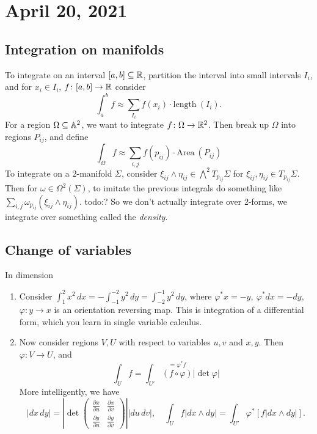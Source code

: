\section{April 20, 2021} 
\subsection{Integration on manifolds}
To integrate on an interval $[a,b]\subseteq \mathbb{R}$, partition the interval into small intervals $I_i $, and for $x_i \in I_i $, $f \colon [a,b] \to \mathbb{R}$ consider\[
    \int_{a}^{b} f\approx \sum_{I_i } f(x_i )\cdot \text{length} \ (I_i ).
\] For a region $\Omega \subseteq \mathbb{A}^2$, we want to integrate $f \colon \Omega \to \mathbb{R}^2$. Then break up $\Omega$ into regions $P_{ij}$, and define \[
\int _{\Omega}f\approx \sum _{i,j}f(p_{ij})\cdot \text{Area} \ (P_{ij}) \] To integrate on a $2$-manifold $\Sigma$, consider $\xi_{ij}\wedge \eta _{ij}\in \bigwedge ^2T_{p_{ij}}\Sigma$ for $\xi_{ij},\eta _{ij}\in T_{p_{ij}}\Sigma$. Then for $\omega \in \Omega^2(\Sigma)$, to imitate the previous integrals do something like $\sum _{i,j}\omega _{p_{ij}}(\xi_{ij}\wedge \eta_{ij})$. {\color{red}todo:?} So we don't actually integrate over 2-forms, we integrate over something called the \emph{density}.

\subsection{Change of variables}
In dimension
\begin{enumerate}[label=\arabic*:]
    \item Consider $\int_{1}^{2} x^2 \, dx=- \int_{-1}^{-2} y^2 \, dy=\int_{-2}^{-1} y^2 \, dy$, where $\varphi ^*x=-y,\ \varphi ^*dx=-dy$, $\varphi  \colon y \to x$ is an orientation reversing map. This is integration of a differential form, which you learn in single variable calculus.
    \item Now consider regions $V,U$ with respect to variables $u,v$ and $x,y$. Then $\varphi  \colon V \to U$, and \[
            \int _{U}f=\int _{U'}\overset{=\varphi ^*f}{(f \circ \varphi )} |\det \varphi | 
    \] More intelligently, we have \[
    |dx\,dy|= \left| \det 
    \begin{pmatrix}
        \frac{\partial x}{\partial u}& \frac{\partial x}{\partial v}\\ \frac{\partial y}{\partial u}& \frac{\partial y}{\partial v}
    \end{pmatrix}\right|  |du\,dv|,\quad \int _U f|dx\wedge dy|= \int _{U'}\varphi ^*[f|dx\wedge dy|] .
    \] 
\end{enumerate}

